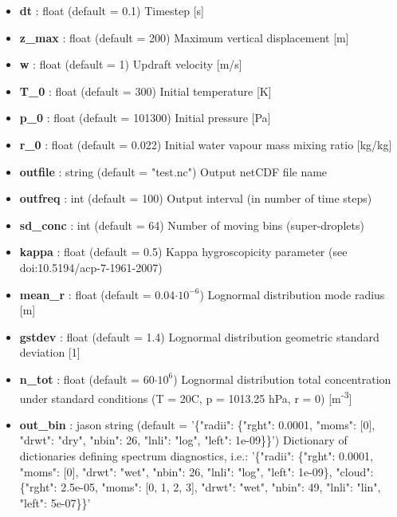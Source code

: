 \documentclass[11pt]{article}
\begin{document}
\begin{itemize}
	\item \textbf{dt} : float (default = 0.1) \newline Timestep [s]
	\item \textbf{z\_max} : float (default = 200) \newline Maximum vertical displacement [m]
	\item \textbf{w} : float (default = 1) \newline Updraft velocity [m/s]
	\item \textbf{T\_0} : float (default = 300) \newline Initial temperature [K]
	\item \textbf{p\_0} : float (default = 101300) \newline Initial pressure [Pa]
	\item \textbf{r\_0} : float (default = 0.022) \newline Initial water vapour mass mixing ratio [kg/kg]
	\item \textbf{outfile} : string (default = "test.nc") \newline Output netCDF file name
	\item \textbf{outfreq} : int (default = 100) \newline Output interval (in number of time steps)
	\item \textbf{sd\_conc} : int (default = 64) \newline Number of moving bins (super-droplets)
	\item \textbf{kappa} : float (default = 0.5) \newline Kappa hygroscopicity parameter \newline (see doi:10.5194/acp-7-1961-2007)
	\item \textbf{mean\_r} : float (default = 0.04$\cdot10^{-6}$) \newline Lognormal distribution mode radius [m]
	\item \textbf{gstdev} : float (default = 1.4) \newline Lognormal distribution geometric standard deviation [1]
	\item \textbf{n\_tot} : float (default = 60$\cdot10^{6}$) \newline Lognormal distribution total concentration under standard conditions (T = 20C, p = 1013.25 hPa, r = 0) [m\textsuperscript{-3}]
	\item \textbf{out\_bin} : jason string \newline (default = '\{"radii": \{"rght": 0.0001, "moms": [0], "drwt": "dry", "nbin": 26, "lnli": "log", "left": 1e-09\}\}') \newline Dictionary of dictionaries defining spectrum diagnostics, i.e.: \newline '\{"radii": \{"rght": 0.0001, "moms": [0], "drwt": "wet", "nbin": 26, "lnli": "log", "left": 1e-09\}, \newline "cloud": \{"rght": 2.5e-05, "moms": [0, 1, 2, 3], "drwt": "wet", "nbin": 49, "lnli": "lin", "left": 5e-07\}\}' 


\end{itemize}
\end{document}
